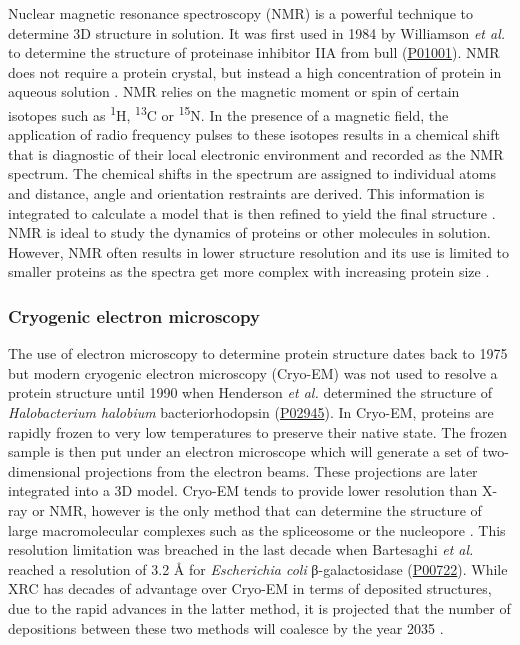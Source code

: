 Nuclear magnetic resonance spectroscopy (NMR) is a powerful technique to determine 3D structure in solution. It was first used in 1984 by Williamson \textit{et al.} \cite{WILLIAMSON_1985_NMR} to determine the structure of proteinase inhibitor IIA from bull (\href{https://www.uniprot.org/uniprotkb/P01001/entry}{P01001}). NMR does not require a protein crystal, but instead a high concentration of protein in aqueous solution \cite{WUTHRICH_1982_NMR}. NMR relies on the magnetic moment or spin of certain isotopes such as \textsuperscript{1}H, \textsuperscript{13}C or \textsuperscript{15}N. In the presence of a magnetic field, the application of radio frequency pulses to these isotopes results in a chemical shift that is diagnostic of their local electronic environment and recorded as the NMR spectrum. The chemical shifts in the spectrum are assigned to individual atoms and distance, angle and orientation restraints are derived. This information is integrated to calculate a model that is then refined to yield the final structure \cite{WUTHRICH_1984_NMR}. NMR is ideal to study the dynamics of proteins or other molecules in solution. However, NMR often results in lower structure resolution and its use is limited to smaller proteins as the spectra get more complex with increasing protein size \cite{EMWAS_2015_NMR}.

\subsubsection{Cryogenic electron microscopy}

The use of electron microscopy to determine protein structure dates back to 1975 \cite{HENDERSON_1975_EM} but modern cryogenic electron microscopy (Cryo-EM) was not used to resolve a protein structure until 1990 when Henderson \textit{et al.} \cite{HENDERSON_1990_CRYOEM} determined the structure of \textit{Halobacterium halobium} bacteriorhodopsin (\href{https://www.uniprot.org/uniprotkb/P02945/entry}{P02945}). In Cryo-EM, proteins are rapidly frozen to very low temperatures to preserve their native state. The frozen sample is then put under an electron microscope which will generate a set of two-dimensional projections from the electron beams. These projections are later integrated into a 3D model. Cryo-EM tends to provide lower resolution than X-ray or NMR, however is the only method that can determine the structure of large macromolecular complexes such as the spliceosome \cite{CHUANGYE_2016_SPLICEOSOME} or the nucleopore \cite{KOSINSKI_2016_NUCLEOPORE}. This resolution limitation was breached in the last decade when Bartesaghi \textit{et al.} \cite{BARTESAGHI_2014_CRYOEM} reached a resolution of 3.2 \AA{} for \textit{Escherichia coli} β-galactosidase (\href{https://www.uniprot.org/uniprotkb/P00722/entry}{P00722}). While XRC has decades of advantage over Cryo-EM in terms of deposited structures, due to the rapid advances in the latter method, it is projected that the number of depositions between these two methods will coalesce by the year 2035 \cite{CHIU_2021_CRYOEM}.

